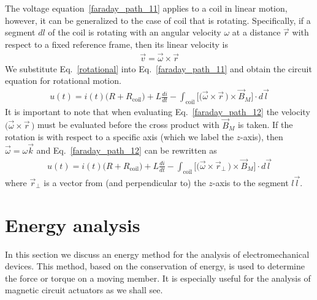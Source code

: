 \documentclass[11pt,a4paper,oneside]{book}
\numberwithin{equation}{section}
\theoremstyle{it}
\theoremstyle{definition}
\begin{document}
The voltage equation~\ref{faraday_path_11} applies to a coil in linear motion, however, it can be generalized to the case of coil that is rotating. Specifically, if a segment $dl$ of the coil is rotating with an angular velocity $\omega$ at a distance $\vec{r}$ with respect to a fixed reference frame, then its linear velocity is
  \begin{equation}\label{rotational}
	\begin{aligned}
		\vec{v}=\vec{\omega}\times\vec{r}
	\end{aligned}
\end{equation} 
We substitute Eq.~\eqref{rotational} into Eq.~\eqref{faraday_path_11} and obtain the circuit equation for rotational motion.
   \begin{equation}\label{faraday_path_12}
 	\begin{aligned}
 		u(t) = i(t)\big(R+R_{\text{coil}}\big)+L\frac{di}{dt}-\int_{\text{coil}}\Big[\big(\vec{\omega}\times\vec{r}\,\big)\times\vec{B}_M\Big]\cdot d\vec{l}
 	\end{aligned}
 \end{equation} 
It is important to note that when evaluating Eq.~\eqref{faraday_path_12} the velocity $\big(\vec{\omega}\times\vec{r}\,\big)$ must be evaluated before the cross product with $\vec{B}_M$ is taken. If the rotation is with respect to a specific axis (which we label the $z$-axis), then $\vec{\omega}=\omega\vec{k}$ and Eq.~\eqref{faraday_path_12} can be rewritten as
   \begin{equation}\label{faraday_path_13}
	\begin{aligned}
		u(t) = i(t)\big(R+R_{\text{coil}}\big)+L\frac{di}{dt}-\int_{\text{coil}}\Big[\big(\vec{\omega}\times\vec{r}_{\perp }\,\big)\times\vec{B}_M\Big]\cdot d\vec{l}
	\end{aligned}
\end{equation} 
where $\vec{r}_{\perp}$ is a vector from (and perpendicular to) the $z$-axis to the segment $l\vec{l}$.

\section{Energy analysis}
In this section we discuss an energy method for the analysis of electromechanical devices. This method, based on the conservation of energy, is used to determine the force or torque on a moving member. It is especially useful for the analysis of magnetic circuit actuators as we shall see.
\end{document}
